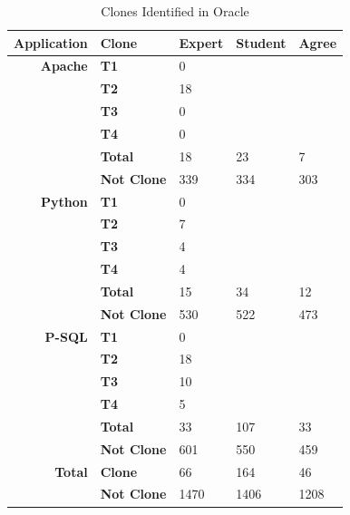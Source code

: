 \documentclass{sig-alternate}
\begin{document}
\begin{table}[thb!]
\begin{center}
\caption{Clones Identified in Oracle}
\vspace{0.1in} %
\label{table:clonesfound}
\begin{tabular}{r||l|l|l|l}
\bfseries Application & \bfseries Clone & \bfseries Expert & \bfseries Student & \bfseries Agree \\ \hline\hline
  \bfseries Apache & \bfseries  T1 & 0 &  \\ \cline{2-3}
   & \bfseries T2 &  18 & \\ \cline{2-3}
& \bfseries  T3 &  0 &  \\ \cline{2-3}
& \bfseries  T4 &  0 &  \\ \cline{2-5}
& \bfseries Total &  18 & 23 & 7 \\ \cline{2-5}
& \bfseries Not Clone &  339 & 334 & 303 \\ \cline{2-5}

\hline
  \bfseries Python & \bfseries T1 & 0 &  \\ \cline{2-3}
   & \bfseries T2 &  7 & \\ \cline{2-3}
& \bfseries  T3 &  4 &  \\ \cline{2-3}
& \bfseries  T4 &  4 &  \\ \cline{2-5}
& \bfseries Total &  15 & 34 & 12 \\ \cline{2-5}
& \bfseries Not Clone &  530 & 522 & 473 \\ \cline{2-5}
\hline

  \bfseries P-SQL & \bfseries T1 & 0 &  \\ \cline{2-3}
   & \bfseries T2 &  18 & \\ \cline{2-3}
& \bfseries  T3 &  10 &  \\ \cline{2-3}
& \bfseries  T4 &  5 &  \\ \cline{2-5}
& \bfseries Total &  33 & 107 & 33 \\ \cline{2-5}
& \bfseries Not Clone &  601 & 550 & 459 \\ \cline{2-5}
\hline \hline
 \bfseries Total & \bfseries Clone & 66 & 164 & 46 \\ \cline{2-5}
  \bfseries  & \bfseries Not Clone & 1470 & 1406 & 1208 \\ \cline{2-5}

  \hline

\end{tabular}

\end{center}

\end{table}
\end{document}
